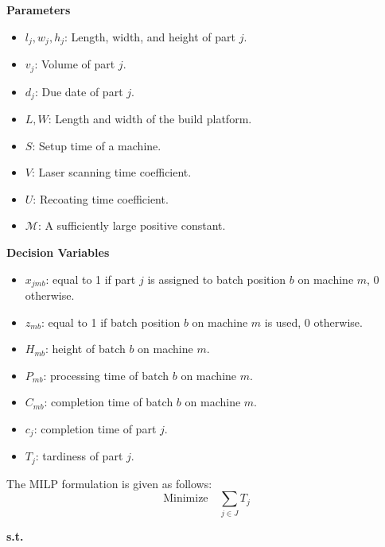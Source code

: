 \documentclass[letterpaper, 10 pt, conference]{ieeeconf}  %
\begin{document}
\noindent \textbf{Parameters}
\begin{itemize}
	\item $l_j, w_j, h_j$: Length, width, and height of part $j$.
	\item $v_j$: Volume of part $j$.
	\item $d_j$: Due date of part $j$.
	\item $L, W$: Length and width of the build platform.
	\item $S$: Setup time of a machine.
	\item $V$: Laser scanning time coefficient.
	\item $U$: Recoating time coefficient.
	\item $\mathcal{M}$: A sufficiently large positive constant.
\end{itemize}

\noindent \textbf{Decision Variables}
\begin{itemize}
	\item $x_{jmb}$: equal to 1 if part $j$ is assigned to batch position $b$ on machine $m$, 0 otherwise.
	\item $z_{mb}$: equal to 1 if batch position $b$ on machine $m$ is used, 0 otherwise.
	\item $H_{mb}$: height of batch $b$ on machine $m$.
	\item $P_{mb}$: processing time of batch $b$ on machine $m$.
	\item $C_{mb}$: completion time of batch $b$ on machine $m$.
	\item $c_j$: completion time of part $j$.
	\item $T_j$: tardiness of part $j$.
\end{itemize}

The MILP formulation is given as follows:
\begin{equation}
	\text{Minimize} \quad \sum_{j \in J} T_j
	\label{obj_pm}
\end{equation}

\noindent \textbf{s.t.}
\end{document}
